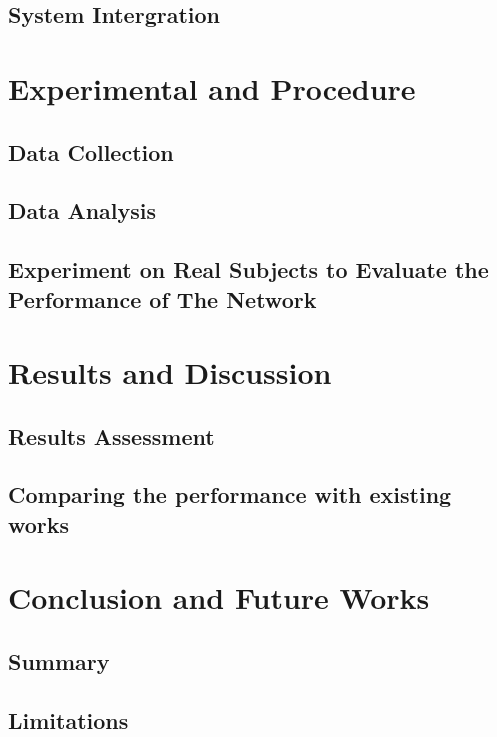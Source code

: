 \documentclass[letterpaper,12pt,titlepage,oneside,final]{book}
\begin{document}
\section{System Intergration}

\chapter{Experimental and Procedure}

\section{Data Collection}

\section{Data Analysis}

\section{Experiment on Real Subjects to Evaluate the Performance of The Network}

\chapter{Results and Discussion}

\section{Results Assessment}

\section{Comparing the performance with existing works}

\chapter{Conclusion and Future Works}

\section{Summary}

\section{Limitations}
\end{document}
